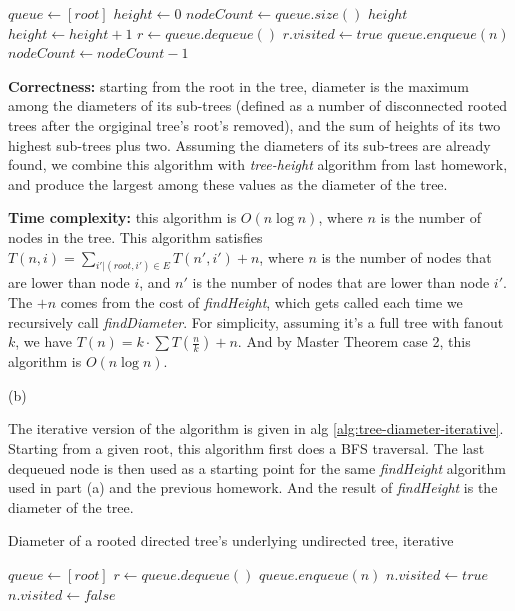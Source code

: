 \documentclass{article}
\begin{document}
\begin{description}
\begin{algorithm}[h]
\begin{algorithmic}[1]
      \State $queue \gets [root]$
      \State $height \gets 0$
        \State $nodeCount \gets queue.size()$
          \State \Return $height$
        \EndIf
        \State $height \gets height + 1$
          \State $r \gets queue.dequeue()$
          \State $r.visited \gets true$
            \State $queue.enqueue(n)$
          \EndFor
          \State $nodeCount \gets nodeCount - 1$
        \EndWhile
      \EndWhile
    \EndFunction
    \end{algorithmic}
  \end{algorithm}

  \textbf{Correctness:} starting from the root in the tree, diameter is the maximum among the diameters of its sub-trees (defined as a number of disconnected rooted trees after the orgiginal tree's root's removed), and the sum of heights of its two highest sub-trees plus two. Assuming the diameters of its sub-trees are already found, we combine this algorithm with \textit{tree-height} algorithm from last homework, and produce the largest among these values as the diameter of the tree.

  \textbf{Time complexity:} this algorithm is $O(n\log{n})$, where $n$ is the number of nodes in the tree. This algorithm satisfies $T(n, i) = \sum_{i' | (root, i') \in E}{T(n', i')} + n$, where $n$ is the number of nodes that are lower than node $i$, and $n'$ is the number of nodes that are lower than node $i'$. The $+n$ comes from the cost of \textit{findHeight}, which gets called each time we recursively call \textit{findDiameter}. For simplicity, assuming it's a full tree with fanout $k$, we have $T(n) = k \cdot \sum{T(\frac{n}{k})} + n$. And by Master Theorem case 2, this algorithm is $O(n\log{n})$.

  (b)

  The iterative version of the algorithm is given in alg \ref{alg:tree-diameter-iterative}. Starting from a given root, this algorithm first does a BFS traversal. The last dequeued node is then used as a starting point for the same \textit{findHeight} algorithm used in part (a) and the previous homework. And the result of \textit{findHeight} is the diameter of the tree.

  \begin{algorithm}[h]
  \caption{Diameter of a rooted directed tree's underlying undirected tree, iterative}
  \label{alg:tree-diameter-iterative}
    \begin{algorithmic}[1]
      \State $queue \gets [root]$
        \State $r \gets queue.dequeue()$
          \State $queue.enqueue(n)$
          \State $n.visited \gets true$
        \EndFor
      \EndWhile
        \State $n.visited \gets false$
      \EndFor


\end{algorithmic}
\end{algorithm}
\end{description}
\end{document}

